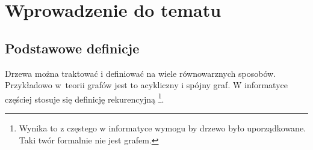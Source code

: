 \chapter{Wprowadzenie do tematu}



\section{Podstawowe definicje}

Drzewa można traktować i definiować na wiele równowarznych sposobów.
Przykładowo w~teorii grafów jest to acykliczny i spójny graf.
W informatyce częściej stosuje się definicję rekurencyjną%
\footnote{
    Wynika to z częstego w informatyce wymogu by drzewo było uporządkowane.
    Taki twór formalnie nie jest grafem.
}.


